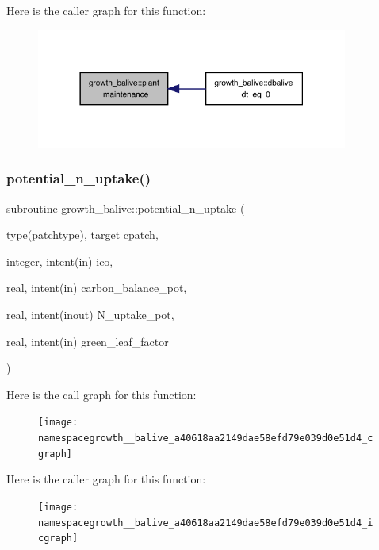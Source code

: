 Here is the caller graph for this function\+:
\nopagebreak
\begin{figure}[H]
\begin{center}
\leavevmode
\includegraphics[width=290pt]{namespacegrowth__balive_af977e6b599dfde9155a3ab3cb7175f16_icgraph}
\end{center}
\end{figure}
\mbox{\label{namespacegrowth__balive_a40618aa2149dae58efd79e039d0e51d4}} 
\subsubsection{\texorpdfstring{potential\+\_\+n\+\_\+uptake()}{potential\_n\_uptake()}}
{\footnotesize\ttfamily subroutine growth\+\_\+balive\+::potential\+\_\+n\+\_\+uptake (\begin{DoxyParamCaption}\item[{type(patchtype), target}]{cpatch,  }\item[{integer, intent(in)}]{ico,  }\item[{real, intent(in)}]{carbon\+\_\+balance\+\_\+pot,  }\item[{real, intent(inout)}]{N\+\_\+uptake\+\_\+pot,  }\item[{real, intent(in)}]{green\+\_\+leaf\+\_\+factor }\end{DoxyParamCaption})}

Here is the call graph for this function\+:
\nopagebreak
\begin{figure}[H]
\begin{center}
\leavevmode
\texttt{[image: namespacegrowth\_\_balive\_a40618aa2149dae58efd79e039d0e51d4\_cgraph]}
\end{center}
\end{figure}
Here is the caller graph for this function\+:
\nopagebreak
\begin{figure}[H]
\begin{center}
\leavevmode
\texttt{[image: namespacegrowth\_\_balive\_a40618aa2149dae58efd79e039d0e51d4\_icgraph]}
\end{center}
\end{figure}
\mbox{\label{namespacegrowth__balive_ac4ca7901eed6321044f171f6f1b8d7d6}} 
